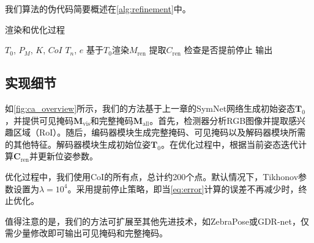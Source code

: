 我们算法的伪代码简要概述在\autoref{alg:refinement}中。

\begin{algorithm}[!ht]
    \caption{渲染和优化过程}
    \label{alg:refinement}
    \renewcommand{\algorithmicrequire}{\textbf{输入:}}
    \renewcommand{\algorithmicensure}{\textbf{输出:}}
    
    \begin{algorithmic}[1]
        \REQUIRE $T_0$, $P_M$, $K$, $CoI$
        \ENSURE $T_n$, $e$    %
        \STATE 基于$T_0$渲染$M_\text{ren}$
        \STATE 提取$C_\text{ren}$
    \STATE 检查是否提前停止
    \ENDFOR
        \RETURN 输出
    \end{algorithmic}
\end{algorithm}

\subsection{实现细节}

如\autoref{fig:ca_overview}所示，我们的方法基于上一章的SymNet网络生成初始姿态$\mathbf{T}_0$，并提供可见掩码$\mathbf{M}_\text{vis}$和完整掩码$\mathbf{M}_\text{all}$。首先，检测器分析RGB图像并提取感兴趣区域（RoI）。随后，编码器模块生成完整掩码、可见掩码以及解码器模块所需的其他特征。解码器模块生成初始位姿$\mathbf{T}_0$。在优化过程中，根据当前姿态迭代计算$\mathbf{C}_\text{ren}$并更新位姿参数。

优化过程中，我们使用CoI的所有点，总计约200个点。默认情况下，Tikhonov参数设置为$\lambda = 10^4$。采用提前停止策略，即当\autoref{eq:error}计算的误差不再减少时，终止优化。

值得注意的是，我们的方法可扩展至其他先进技术，如ZebraPose\cite{su2022zebrapose}或GDR-net\cite{wang2021gdr}，仅需少量修改即可输出可见掩码和完整掩码。
